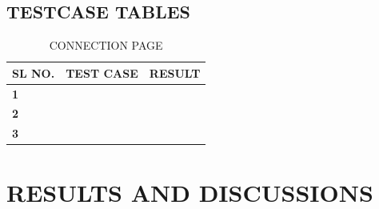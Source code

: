 \documentclass[11pt]{report} %
\begin{document}
\section{TESTCASE TABLES}
\label{sec:TESTCASE TABLES}

\begin{table}[h]
	\centering
	\caption{CONNECTION PAGE}
	\label{tab:CONNECTION PAGE}
	\begin{tabular}{|l|l|l|}
		\hline
		\textbf{SL NO.} & \textbf{TEST CASE} & \textbf{RESULT} \\ \hline
		\textbf{1}      & \textbf{}          & \textbf{}       \\ \hline
		\textbf{2}      & \textbf{}          & \textbf{}       \\ \hline
		\textbf{3}      & \textbf{}          & \textbf{}       \\ \hline
	\end{tabular}
\end{table}


\chapter{RESULTS AND DISCUSSIONS}
\end{document}
